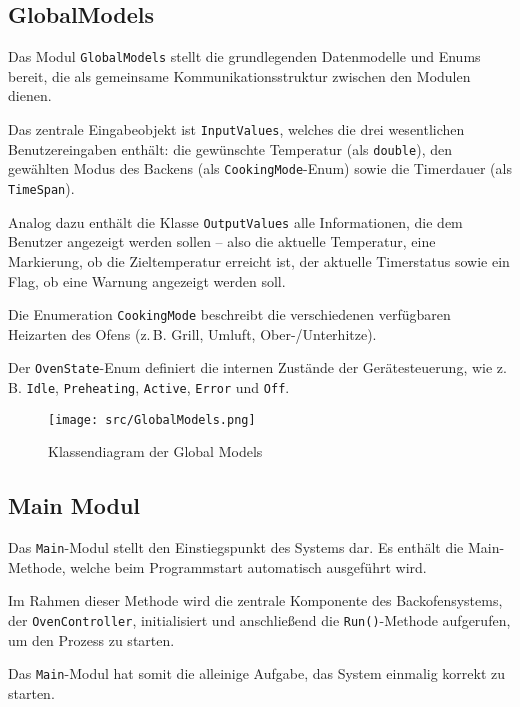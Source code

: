 \documentclass[a4paper,12pt]{article}
\begin{document}
\newpage

\subsection*{GlobalModels}

Das Modul \texttt{GlobalModels} stellt die grundlegenden Datenmodelle und Enums bereit, die als gemeinsame Kommunikationsstruktur zwischen den Modulen dienen.

Das zentrale Eingabeobjekt ist \texttt{InputValues}, welches die drei wesentlichen Benutzereingaben enthält: die gewünschte Temperatur (als \texttt{double}), den gewählten Modus des Backens (als \texttt{CookingMode}-Enum) sowie die Timerdauer (als \texttt{TimeSpan}).

Analog dazu enthält die Klasse \texttt{OutputValues} alle Informationen, die dem Benutzer angezeigt werden sollen – also die aktuelle Temperatur, eine Markierung, ob die Zieltemperatur erreicht ist, der aktuelle Timerstatus sowie ein Flag, ob eine Warnung angezeigt werden soll.

Die Enumeration \texttt{CookingMode} beschreibt die verschiedenen verfügbaren Heizarten des Ofens (z.\,B. Grill, Umluft, Ober-/Unterhitze).

Der \texttt{OvenState}-Enum definiert die internen Zustände der Gerätesteuerung, wie z.\,B. \texttt{Idle}, \texttt{Preheating}, \texttt{Active}, \texttt{Error} und \texttt{Off}.

\begin{figure}[h!]
  \centering
  \texttt{[image: src/GlobalModels.png]}
  \caption{Klassendiagram der Global Models}
  \label{fig:globalmodels}
\end{figure}

\newpage

\subsection*{Main Modul}

Das \texttt{Main}-Modul stellt den Einstiegspunkt des Systems dar. Es enthält die Main-Methode, welche beim Programmstart automatisch ausgeführt wird.

Im Rahmen dieser Methode wird die zentrale Komponente des Backofensystems, der \texttt{OvenController}, initialisiert und anschließend die \texttt{Run()}-Methode aufgerufen, um den Prozess zu starten.

Das \texttt{Main}-Modul hat somit die alleinige Aufgabe, das System einmalig korrekt zu starten.
\end{document}
